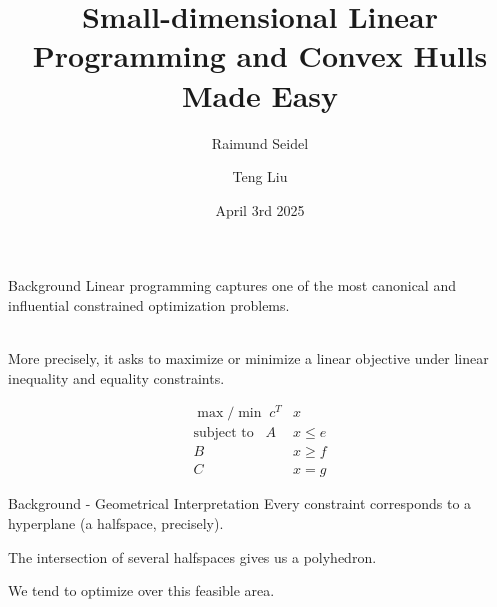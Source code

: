 \documentclass{beamer}
\title[Seminar Geometry: Combinatorics and Algorithms FS25] %
{Small-dimensional Linear Programming and Convex Hulls Made Easy}
\subtitle{Raimund Seidel}
\author[Teng Liu] %
{Teng Liu}
\date[]{April 3rd 2025}
\begin{document}
\frame{\titlepage}

\begin{frame}{Background}
	Linear programming captures one of the most canonical and influential constrained optimization problems. \\~\

	More precisely, it asks to maximize or minimize a linear objective under linear
	inequality and equality constraints.


	\begin{align*}
		\max / \min \; c^T         & x       \\
		\text{subject to} \;\;\; A & x \le e \\
		B                          & x \ge f \\
		C                          & x = g
	\end{align*}


\end{frame}

\begin{frame}{Background - Geometrical Interpretation}
	Every constraint corresponds to a hyperplane (a halfspace, precisely).

	The intersection of several halfspaces gives us a polyhedron.

	We tend to optimize over this feasible area.
\end{frame}
\end{document}
